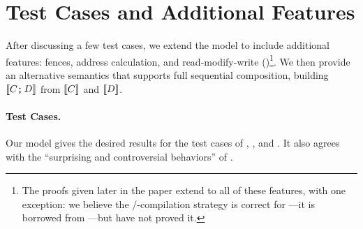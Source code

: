 \section{Test Cases and Additional Features}
\label{sec:variants}

After discussing a few test cases, we extend the model to include additional
features: fences, address calculation, and read-modify-write
(\RMW)\footnote{The proofs given later in the paper extend to all of these
  features, with one exception: we believe the \armeight/\tso-compilation
  strategy is correct for \RMW---it is borrowed from
  \citet{DBLP:journals/pacmpl/PodkopaevLV19}---but have not proved it.}.  We
then provide an alternative semantics that supports full sequential
composition, building $\llbracket C\texttt{;}\,\allowbreak D\rrbracket$ from $\llbracket C\rrbracket$ and
$\llbracket D\rrbracket$.

\paragraph{Test Cases.}
Our model gives the desired results for the test cases of \citet{PughWebsite},
\citet[]{SevcikThesis}, and \citet[]{DBLP:conf/esop/BattyMNPS15}.  It also agrees with the ``surprising and
controversial behaviors'' of \citet[]{Manson:2005:JMM:1047659.1040336}.


